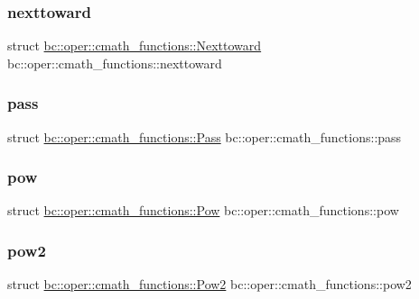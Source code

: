 \subsubsection{\texorpdfstring{nexttoward}{nexttoward}}
{\footnotesize\ttfamily struct \hyperlink{structbc_1_1oper_1_1cmath__functions_1_1Nexttoward}{bc\+::oper\+::cmath\+\_\+functions\+::\+Nexttoward}   bc\+::oper\+::cmath\+\_\+functions\+::nexttoward}

\mbox{\label{namespacebc_1_1oper_1_1cmath__functions_a9dd42da140176c84d6ede52a57b47fcf}} 
\subsubsection{\texorpdfstring{pass}{pass}}
{\footnotesize\ttfamily struct \hyperlink{structbc_1_1oper_1_1cmath__functions_1_1Pass}{bc\+::oper\+::cmath\+\_\+functions\+::\+Pass}   bc\+::oper\+::cmath\+\_\+functions\+::pass}

\mbox{\label{namespacebc_1_1oper_1_1cmath__functions_ac48d604f1db405de10548e1248c5a0c7}} 
\subsubsection{\texorpdfstring{pow}{pow}}
{\footnotesize\ttfamily struct \hyperlink{structbc_1_1oper_1_1cmath__functions_1_1Pow}{bc\+::oper\+::cmath\+\_\+functions\+::\+Pow}  bc\+::oper\+::cmath\+\_\+functions\+::pow}

\mbox{\label{namespacebc_1_1oper_1_1cmath__functions_a89f45093b7ad33d76972df63245ffd16}} 
\subsubsection{\texorpdfstring{pow2}{pow2}}
{\footnotesize\ttfamily struct \hyperlink{structbc_1_1oper_1_1cmath__functions_1_1Pow2}{bc\+::oper\+::cmath\+\_\+functions\+::\+Pow2}   bc\+::oper\+::cmath\+\_\+functions\+::pow2}

